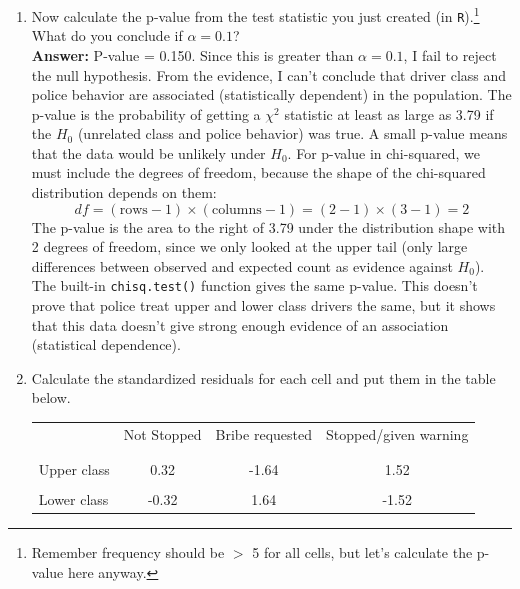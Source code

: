\documentclass[12pt,letterpaper]{article}
\begin{document}
\begin{enumerate}
	\item [(b)]
	Now calculate the p-value from the test statistic you just created (in \texttt{R}).\footnote{Remember frequency should be $>$ 5 for all cells, but let's calculate the p-value here anyway.}  What do you conclude if $\alpha = 0.1$?\\
	
	\noindent \textbf{Answer:}  P-value = 0.150. Since this is greater than $\alpha = 0.1$, I fail to reject the null hypothesis. From the evidence, I can't conclude that driver class and police behavior are associated (statistically dependent) in the population.
	\noindent The p-value is the probability of getting a $\chi^2$ statistic at least as large as 3.79 if the $H_0$ (unrelated class and police behavior) was true. A small p-value means that the data would be unlikely under $H_0$. For p-value in chi-squared, we must include the degrees of freedom, because the shape of the chi-squared distribution depends on them: \[ df = (\text{rows} - 1) \times (\text{columns} - 1) = (2 - 1) \times (3 - 1) = 2 \] The p-value is the area to the right of 3.79 under the distribution shape with 2 degrees of freedom, since we only looked at the upper tail (only large differences between observed and expected count as evidence against $H_0$). The built-in \texttt{chisq.test()} function gives the same p-value. This doesn't prove that police treat upper and lower class drivers the same, but it shows that this data doesn't give strong enough evidence of an association (statistical dependence). 
	\newpage
	\item [(c)] Calculate the standardized residuals for each cell and put them in the table below.
	
	\begin{table}[h]
		\centering
		\begin{tabular}{l | c c c }
			& Not Stopped & Bribe requested & Stopped/given warning \\
			\\[-1.8ex] 
			\hline \\[-1.8ex]
			Upper class  & 0.32 & -1.64 & 1.52  \\
			\\
			Lower class & -0.32 & 1.64  & -1.52  \\
			

\end{tabular}
\end{table}
\end{enumerate}
\end{document}

